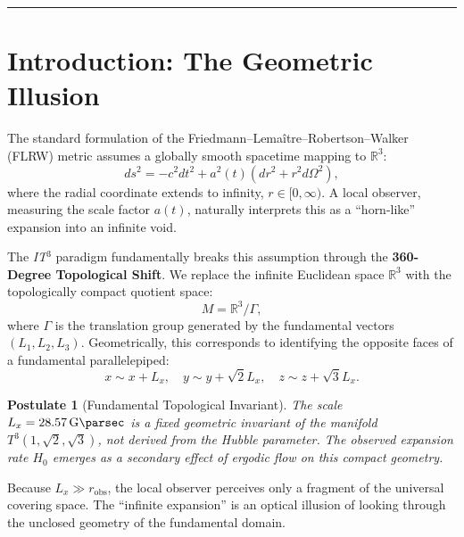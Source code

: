 \documentclass[12pt, a4paper]{article}
\newtheorem{postulate}{Postulate}
\newcommand{\ITthree}{\textit{IT}\ensuremath{^3}}
\newcommand{\Tthree}{\ensuremath{T^3(1,\sqrt{2},\sqrt{3})}}
\newcommand{\Lx}{\ensuremath{L_x}}
\begin{document}
\vspace{0.5cm}
\hrule
\vspace{0.5cm}

\section{Introduction: The Geometric Illusion}
\label{sec:intro}

The standard formulation of the Friedmann--Lemaître--Robertson--Walker (FLRW) metric assumes a globally smooth spacetime mapping to $\mathbb{R}^3$:
\begin{equation}
  ds^2 = -c^2 dt^2 + a^2(t)\left(dr^2 + r^2 d\Omega^2\right),
  \label{eq:flrw}
\end{equation}
where the radial coordinate extends to infinity, $r \in [0, \infty)$. A local observer, measuring the scale factor $a(t)$, naturally interprets this as a ``horn-like'' expansion into an infinite void.

The \ITthree{} paradigm fundamentally breaks this assumption through the \textbf{360-Degree Topological Shift}. We replace the infinite Euclidean space $\mathbb{R}^3$ with the topologically compact quotient space:
\begin{equation}
  M = \mathbb{R}^3 / \Gamma,
  \label{eq:quotient}
\end{equation}
where $\Gamma$ is the translation group generated by the fundamental vectors $(L_1, L_2, L_3)$. Geometrically, this corresponds to identifying the opposite faces of a fundamental parallelepiped:
\begin{equation}
  x \sim x + L_x, \quad
  y \sim y + \sqrt{2}L_x, \quad
  z \sim z + \sqrt{3}L_x.
  \label{eq:identification}
\end{equation}

\begin{postulate}[Fundamental Topological Invariant]
  The scale $\Lx = \SI{28.57}{\giga\parsec}$ is a fixed geometric invariant of the manifold \Tthree{}, \textit{not} derived from the Hubble parameter. The observed expansion rate $H_0$ emerges as a secondary effect of ergodic flow on this compact geometry.
\end{postulate}

Because $\Lx \gg r_{\text{obs}}$, the local observer perceives only a fragment of the universal covering space. The ``infinite expansion'' is an optical illusion of looking through the unclosed geometry of the fundamental domain.
\end{document}
